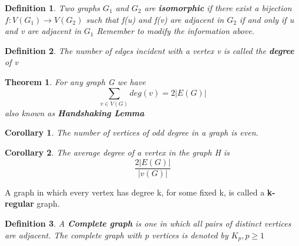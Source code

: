 \documentclass[10pt, a4paper]{article}
\newtheorem*{thm}{Theorem}
\newtheorem*{defn}{Definition}
\newtheorem*{corol}{Corollary}
\begin{document}
\begin{defn}
 Two graphs $G_1$ and $G_2$ are \textbf{isomorphic} if there exist a bijection $f:V(G_1) \rightarrow V(G_2)$ such that f(u) and f(v) are adjacent in $G_2$ if and only if u and v are adjacent in $G_1$    
Remember to modify the information above.
\end{defn}

\begin{defn}
    The number of edges incident with a vertex v is called the \textbf{degree} of v
\end{defn}

\begin{thm}
    For any graph G we have
    \[\sum_{v \in V(G)} deg(v) = 2 |E(G)|\]
    also known as \textbf{Handshaking Lemma}
\end{thm}
\begin{corol}
    The number of vertices of odd degree in a graph is even.
\end{corol}
\begin{corol}
    The average degree of a vertex in the graph H is 
    \[\frac{2|E(G)|}{|v(G)|}\]
    
\end{corol}
\begin{term}
    A graph in which every vertex has degree k, for some fixed k, is called a \textbf{k-regular} graph.
\end{term}
\begin{defn}
    A \textbf{Complete graph} is one in which all pairs of distinct vertices are adjacent. The complete graph with p vertices is denoted by $K_p, p\ge 1$
\end{defn}
\end{document}

